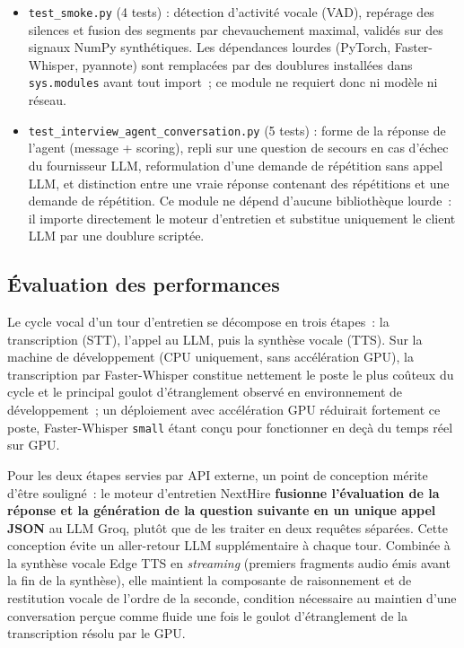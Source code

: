 \begin{itemize}
  \item \texttt{test\_smoke.py} (4 tests) : détection d'activité vocale (VAD), repérage des
        silences et fusion des segments par chevauchement maximal, validés sur des signaux
        NumPy synthétiques. Les dépendances lourdes (PyTorch, Faster-Whisper, pyannote) sont
        remplacées par des doublures installées dans \texttt{sys.modules} avant tout import~;
        ce module ne requiert donc ni modèle ni réseau.
  \item \texttt{test\_interview\_agent\_conversation.py} (5 tests) : forme de la réponse de
        l'agent (message + scoring), repli sur une question de secours en cas d'échec du
        fournisseur LLM, reformulation d'une demande de répétition sans appel LLM, et
        distinction entre une vraie réponse contenant des répétitions et une demande de
        répétition. Ce module ne dépend d'aucune bibliothèque lourde~: il importe directement
        le moteur d'entretien et substitue uniquement le client LLM par une doublure scriptée.
\end{itemize}

\subsection{Évaluation des performances}

Le cycle vocal d'un tour d'entretien se décompose en trois étapes~: la transcription
(STT), l'appel au LLM, puis la synthèse vocale (TTS). Sur la machine de développement
(CPU uniquement, sans accélération GPU), la transcription par Faster-Whisper constitue
nettement le poste le plus coûteux du cycle et le principal goulot d'étranglement observé
en environnement de développement~; un déploiement avec accélération GPU réduirait
fortement ce poste, Faster-Whisper \texttt{small} étant conçu pour fonctionner en deçà du
temps réel sur GPU.

\begin{sloppypar}
Pour les deux étapes servies par API externe, un point de conception mérite d'être
souligné~: le moteur d'entretien NextHire \textbf{fusionne l'évaluation de la réponse et
la génération de la question suivante en un unique appel JSON} au LLM Groq, plutôt que de
les traiter en deux requêtes séparées. Cette conception évite un aller-retour LLM
supplémentaire à chaque tour. Combinée à la synthèse vocale Edge TTS en \textit{streaming}
(premiers fragments audio émis avant la fin de la synthèse), elle maintient la composante
de raisonnement et de restitution vocale de l'ordre de la seconde, condition nécessaire
au maintien d'une conversation perçue comme fluide une fois le goulot d'étranglement de
la transcription résolu par le GPU.
\end{sloppypar}

